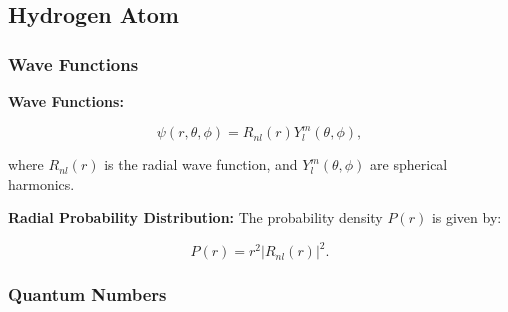 \documentclass{article}
\newcommand{\eqbox}[1]{\begin{tcolorbox}[colback=gray!10] #1 \end{tcolorbox}}
\newcommand{\conceptbox}[1]{\begin{tcolorbox}[colback=blue!10] #1 \end{tcolorbox}}
\begin{document}
\subsection{Hydrogen Atom}

\subsubsection{Wave Functions}
\conceptbox{
\textbf{Wave Functions:}
\eqbox{
\[
\psi(r, \theta, \phi) = R_{nl}(r)Y_l^m(\theta, \phi),
\]}
where \( R_{nl}(r) \) is the radial wave function, and \( Y_l^m(\theta, \phi) \) are spherical harmonics.

\textbf{Radial Probability Distribution:}
The probability density \( P(r) \) is given by:
\eqbox{
\[
P(r) = r^2|R_{nl}(r)|^2.
\]}
}

\subsubsection{Quantum Numbers}
\end{document}
